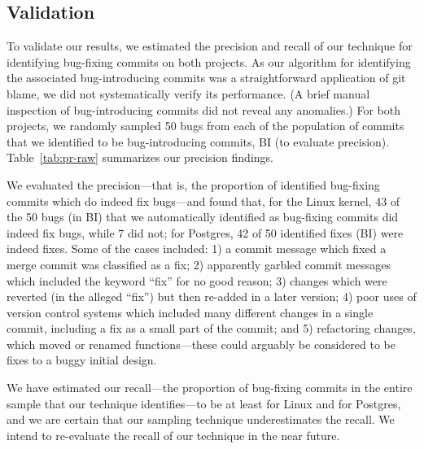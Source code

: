 
\subsection{Validation} 
\label{sec-validation}
To validate our results, we estimated the precision and recall of our
technique for identifying bug-fixing commits on both projects.  As our
algorithm for identifying the associated bug-introducing commits was a
straightforward application of git blame, we did not systematically
verify its performance. (A brief manual inspection of bug-introducing
commits did not reveal any anomalies.) 
For both projects, we randomly sampled 50 bugs
from each of the population of commits that we identified to be
bug-introducing commits, BI (to evaluate precision).
Table~\ref{tab:pr-raw} summarizes our precision findings.

We evaluated the precision---that is, the proportion of identified
bug-fixing commits which do indeed fix bugs---and found that, for
the Linux kernel, 43 of the 50 bugs (in BI) that we automatically identified as
bug-fixing commits did indeed fix bugs, while 7 did not; for Postgres,
42 of 50 identified fixes (BI) were indeed fixes.  Some of the
cases included: 1) a commit message which fixed a merge commit was
classified as a fix; 2) apparently garbled commit messages which
included the keyword ``fix'' for no good reason; 3) changes which were
reverted (in the alleged ``fix'') but then re-added in a later
version; 4) poor uses of version control systems which included many
different changes in a single commit, including a fix as a small part 
of the commit; and 5) refactoring changes, which moved or renamed
functions---these could arguably be considered to be fixes to a buggy
initial design.

We have estimated our recall---the proportion of bug-fixing commits in
the entire sample that our technique identifies---to be at least \linuxR for
Linux and \postR for Postgres, and we are certain that our sampling
technique underestimates the recall. We intend to re-evaluate the
recall of our technique in the near future.

